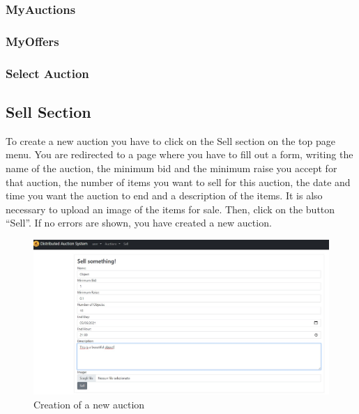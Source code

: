 
\subsubsection{MyAuctions}

\subsubsection{MyOffers}

\subsubsection{Select Auction}


\subsection{Sell Section}

To create a new auction you have to click on the Sell section on the top page
menu. You are redirected to a page where you have to fill out a form, writing
the name of the auction, the minimum bid and the minimum raise you accept for
that auction, the number of items you want to sell for this auction, the date
and time you want the auction to end and a description of the items. It is also
necessary to upload an image of the items for sale. Then, click on the button
``Sell''. If no errors are shown, you have created a new auction.

\begin{figure}[htb]
	\centering
	\includegraphics[width=\textwidth]{img/sell.jpg}
	\caption{Creation of a new auction}\label{fig:create-auction}
\end{figure}
